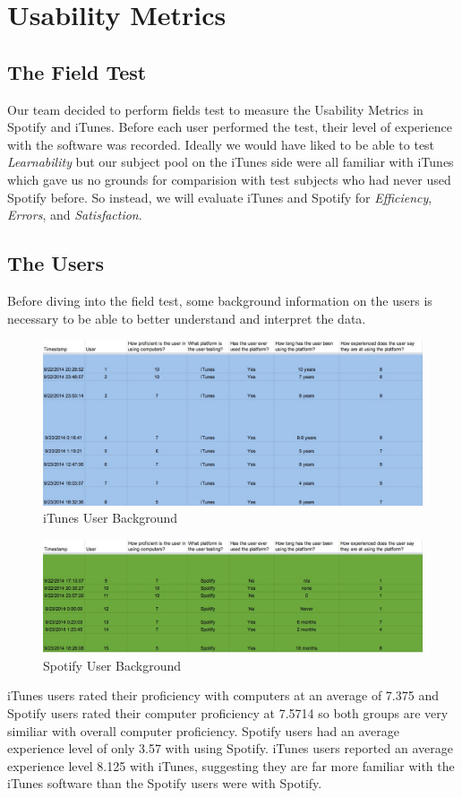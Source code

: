 \documentclass[a4paper]{article}
\begin{document}
\section{Usability Metrics}
\label{sec:usabilityMetrics}

\subsection{The Field Test}
Our team decided to perform fields test to measure the Usability Metrics in Spotify and iTunes. Before each user performed the test, their level of experience with the software was recorded. Ideally we would have liked to be able to test \textit{Learnability} but our subject pool on the iTunes side were all familiar with iTunes which gave us no grounds for comparision with test subjects who had never used Spotify before. So instead, we will evaluate iTunes and Spotify for \textit{Efficiency}, \textit{Errors}, and \textit{Satisfaction}.

\subsection{The Users}
Before diving into the field test, some background information on the users is necessary to be able to better understand and interpret the data.
\begin{figure}[H]
\centering
\includegraphics[width=1\textwidth]{itunesuserbackground_copy.jpg}
\caption{\label{userdata: itunes}iTunes User Background}
\end{figure}
\begin{figure}[H]
\centering
\includegraphics[width=1\textwidth]{spotifyuserbackground_copy.jpg}
\caption{\label{userdata: spotify}Spotify User Background}
\end{figure}
iTunes users rated their proficiency with computers at an average of 7.375 and Spotify users rated their computer proficiency at 7.5714 so both groups are very similiar with overall computer proficiency. Spotify users had an average experience level of only 3.57 with using Spotify. iTunes users reported an average experience level 8.125 with iTunes, suggesting they are far more familiar with the iTunes software than the Spotify users were with Spotify. 
\end{document}
